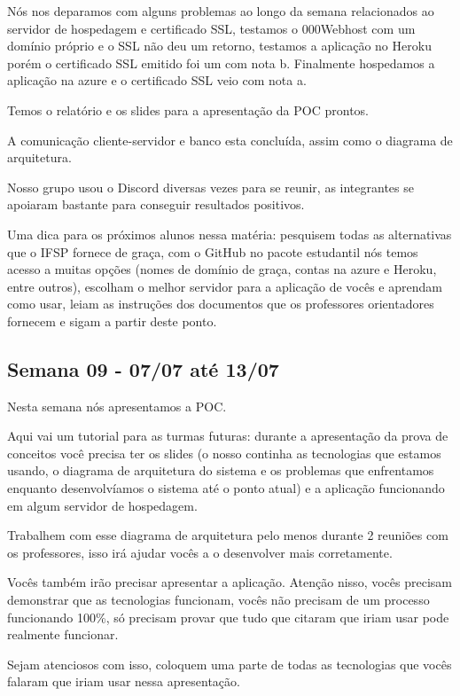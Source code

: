 \begin{apendicesenv}
\begin{flushleft}
Nós nos deparamos com alguns problemas ao longo da semana relacionados ao servidor de hospedagem e certificado \ac{SSL}, testamos o \gls{000Webhost} com um domínio próprio e o \ac{SSL} não deu um retorno, testamos a aplicação no \gls{Heroku} porém o certificado \ac{SSL} emitido foi um com nota b. Finalmente hospedamos a aplicação na azure e o certificado \ac{SSL} veio com nota a.

Temos o relatório e os slides para a apresentação da \ac{POC} prontos.

A comunicação cliente-servidor e banco esta concluída, assim como o diagrama de arquitetura.

Nosso grupo usou o \gls{Discord} diversas vezes para se reunir, as integrantes se apoiaram bastante para conseguir resultados positivos.

Uma dica para os próximos alunos nessa matéria: pesquisem todas as alternativas que o \ac{IFSP} fornece de graça, com o \gls{GitHub} no pacote estudantil nós temos acesso a muitas opções (nomes de domínio de graça, contas na azure e \gls{Heroku}, entre outros), escolham o melhor servidor para a aplicação de vocês e aprendam como usar, leiam as instruções dos documentos que os professores orientadores fornecem e sigam a partir deste ponto.
\end{flushleft}
\begin{flushleft}
 \section{Semana 09 - 07/07 até 13/07}
 Nesta semana nós apresentamos a \ac{POC}.

Aqui vai um tutorial para as turmas futuras: durante a apresentação da prova de conceitos você precisa ter os slides (o nosso continha as tecnologias que estamos usando, o diagrama de arquitetura do sistema e os problemas que enfrentamos enquanto desenvolvíamos o sistema até o ponto atual) e a aplicação funcionando em algum servidor de hospedagem.

Trabalhem com esse diagrama de arquitetura pelo menos durante 2 reuniões com os professores, isso irá ajudar vocês a o desenvolver mais corretamente.

Vocês também irão precisar apresentar a aplicação. Atenção nisso, vocês precisam demonstrar que as tecnologias funcionam, vocês não precisam de um processo funcionando 100\%, só precisam provar que tudo que citaram que iriam usar pode realmente funcionar. 

Sejam atenciosos com isso, coloquem uma parte de todas as tecnologias que vocês falaram que iriam usar nessa apresentação.


\end{flushleft}
\end{apendicesenv}
